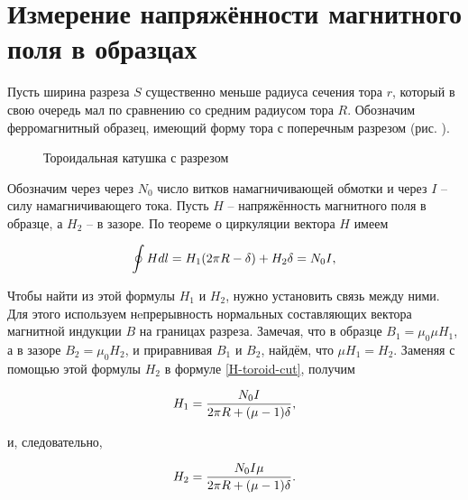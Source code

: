 \section{Измерение напряжённости магнитного поля в образцах}

Пусть ширина разреза $S$ существенно меньше радиуса сечения тора $r$, который в свою очередь мал по сравнению со средним радиусом тора $R$. Обозначим ферромагнитный образец, имеющий форму тора с поперечным разрезом (рис. ).


\begin{wrapfigure}{r}{0.4\textwidth}
	\caption{Тороидальная катушка с разрезом}
\end{wrapfigure}

Обозначим через через $N_0$ число витков намагничивающей обмотки и через $I$ -- силу намагничивающего тока. Пусть $H$ -- напряжённость магнитного поля в образце, а $H_2$ -- в зазоре. По теореме о циркуляции вектора $H$ имеем


\begin{equation}
	\eqmark{H-toroid-cut}
	\oint {Hdl} = H_1 (2\pi R - \delta) + H_2 \delta  = N_0 I,
\end{equation}

Чтобы найти из этой формулы $H_1$ и $H_2$, нужно установить связь между ними. Для этого используем нeпрерывность нормальных составляющих вектора магнитной индукции $B$ на границах разреза. Замечая, что в образце $B_1 = \mu_0 \mu H_1$, а в зазоре $B_2 = \mu_0 H_2$, и приравнивая $B_1$ и $B_2$, найдём, что $\mu H_1 = H_2$. Заменяя с помощью этой формулы $H_2$ в формуле \eqref{H-toroid-cut}, получим


\begin{equation}
	\eqmark{H1-toroid-inside}
	H_1 = \frac{N_0 I}{2\pi R + (\mu - 1)\delta},
\end{equation}

и, следовательно,

\begin{equation}
	\eqmark{H2-toroid-gap}
	H_2 = \frac{N_0 I \mu}{2\pi R + (\mu - 1)\delta}.
\end{equation}

